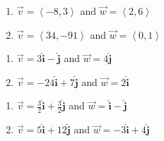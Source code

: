 \begin{multicols}{2} 

\begin{enumerate}

\setcounter{enumi}{\value{HW}}

\item $\vec{v} = \left\langle -8, 3 \right\rangle$ and $\vec{w} = \left\langle 2, 6 \right\rangle$
\item $\vec{v} = \left\langle 34, -91 \right\rangle$ and $\vec{w} = \left\langle 0, 1 \right\rangle$

\setcounter{HW}{\value{enumi}}

\end{enumerate}

\end{multicols}

\begin{multicols}{2} 

\begin{enumerate}

\setcounter{enumi}{\value{HW}}

\item $\vec{v} =3 \bm\hat{\text{i}}-  \bm\hat{\text{j}}$ and $\vec{w} = 4 \bm\hat{\text{j}}$
\item $\vec{v} = -24 \bm\hat{\text{i}}+ 7 \bm\hat{\text{j}}$ and $\vec{w} = 2 \bm\hat{\text{i}}$

\setcounter{HW}{\value{enumi}}

\end{enumerate}

\end{multicols}

\begin{multicols}{2} 

\begin{enumerate}

\setcounter{enumi}{\value{HW}}

\item $\vec{v} =\frac{3}{2}  \bm\hat{\text{i}}+ \frac{3}{2}  \bm\hat{\text{j}}$ and $\vec{w} =  \bm\hat{\text{i}}-  \bm\hat{\text{j}}$
\item $\vec{v} = 5 \bm\hat{\text{i}}+12 \bm\hat{\text{j}}$ and $\vec{w} = -3 \bm\hat{\text{i}}+ 4 \bm\hat{\text{j}}$

\setcounter{HW}{\value{enumi}}

\end{enumerate}

\end{multicols}

